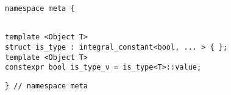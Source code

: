 
\begin{verbatim}
namespace meta {
\end{verbatim}
\begin{verbatim}

template <Object T>
struct is_type : integral_constant<bool, ... > { };
template <Object T>
constexpr bool is_type_v = is_type<T>::value;

\end{verbatim}
\begin{verbatim}
} // namespace meta
\end{verbatim}
